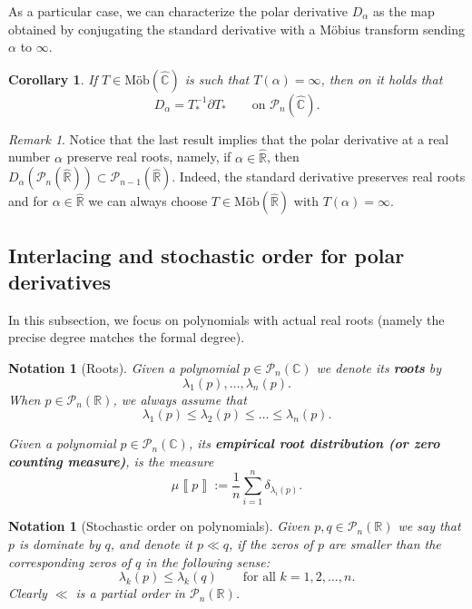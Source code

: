 \documentclass[reqno,11pt]{amsart}
\newtheorem{corollary}[theorem]{Corollary}
\newtheorem{notation}[theorem]{Notation}
\theoremstyle{remark}
\newtheorem{remark}[theorem]{Remark}
\newcommand{\cc}{\mathbb{C}}
\newcommand{\rr}{\mathbb{R}}
\newcommand{\PP}{\mathcal{P}}
\newcommand{\polar}[1]{D_{#1}}
\newcommand{\mobr}{\text{Möb}(\hat{\rr})}
\newcommand{\mobc}{\text{Möb}(\hat{\cc})}
\newcommand{\meas}[1]{\mu \left\llbracket #1 \right\rrbracket}
\newcommand{\pol}{\mathcal{P}}
\newcommand{\polreal}[1]{\mathcal{P}_{#1}(\mathbb{R})}
\begin{document}
As a particular case, we can characterize the polar derivative $\polar{\alpha}$ as the map obtained by conjugating the standard derivative with a Möbius transform sending $\alpha$ to $\infty$.

\begin{corollary}
If $T\in\mobc$ is such that $T(\alpha)=\infty$, then on it holds that
$$D_\alpha= T_*^{-1} \partial T_* \qquad \text{on }\PP_n(\hat{\cc}).$$
\end{corollary}

\begin{remark}
Notice that the last result implies that the polar derivative at a real number $\alpha$ preserve real roots, namely, if $\alpha\in \hat{\rr}$, then $ \polar{\alpha} \left(\pol_n(\hat{\rr}) \right) \subset \pol_{n-1}(\hat{\rr}) $. Indeed, the standard derivative preserves real roots and for $\alpha\in \hat{\rr}$ we can always choose $T\in \mobr$ with $T(\alpha)=\infty$.
\end{remark}



\subsection{Interlacing and stochastic order for polar derivatives}
In this subsection, we focus on polynomials with actual real roots (namely the precise degree matches the formal degree).

\begin{notation}[Roots]
Given a polynomial $p\in \pol_n(\cc)$ we denote its \textbf{roots} by 
$$\lambda_1(p), \dots, \lambda_n(p).$$ 
When $p\in\polreal{n}$, we always assume that 
\begin{equation}
\label{eq:zeros}
\lambda_1(p)\leq\lambda_2(p)\leq \dots\leq \lambda_n(p).
\end{equation}

Given a polynomial $p\in\pol_n(\cc)$, its \textbf{empirical root distribution (or zero counting measure)}, is the measure 
\begin{equation}
 \meas{p} :=\frac{1}{n} \sum_{i=1}^n \delta_{\lambda_i(p)}.
\end{equation}
\end{notation}

\begin{notation}[Stochastic order on polynomials]
\label{nota:partial.order}
Given $p,q\in\PP_n(\rr)$ we say that $p$ is dominate by $q$, and denote it $p \ll q$, if the zeros of $p$ are smaller than the corresponding zeros of $q$ in the following sense:
\[\lambda_k(p) \leq \lambda_k(q) \qquad \text{for all }k=1,2,\dots,n.\]
Clearly $\ll$ is a partial order in $\pol_n(\rr)$.
\end{notation}
\end{document}
